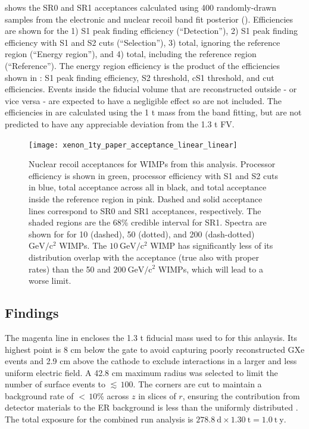  shows the SR0 and SR1 acceptances calculated using 400 randomly-drawn samples from the
electronic and nuclear recoil band fit posterior ().  Efficiencies are shown for the 1) S1 peak finding
efficiency (``Detection''), 2) S1 peak finding efficiency with
S1 and S2 cuts (``Selection''), 3) total, ignoring the reference region (``Energy region''), and 4) total, including the reference
region (``Reference'').  The energy region efficiency is the product of the efficiencies shown
in : S1 peak finding efficiency, S2 threshold, cS1 threshold, and
cut efficiencies.  Events inside the fiducial volume that are reconstructed outside - or vice versa - are expected to have a negligible
effect so are not included.  The
efficiencies in  are calculated using the 1 t mass from the band fitting, but are not
predicted to have any appreciable deviation from the 1.3 t FV.

\begin{figure}
\centering
\texttt{[image: xenon\_1ty\_paper\_acceptance\_linear\_linear]}
\caption[Nuclear recoil acceptances for WIMPs from this analysis and spectra for 10, 50, and $200\ \mathrm{GeV/c^2}$ WIMPs.]{Nuclear
recoil acceptances for WIMPs from this analysis.  Processor efficiency is shown in green, processor efficiency with S1
and S2 cuts in blue, total acceptance across all \cstwob in black, and total acceptance inside the reference region in pink.  Dashed and
solid acceptance lines correspond to SR0 and SR1 acceptances,
respectively.  The shaded regions are the 68\% credible interval for SR1.  Spectra are shown for for 10 (dashed), 50 (dotted), and
200 (dash-dotted) $\mathrm{GeV/c^2}$ WIMPs.  The $10\ \mathrm{GeV/c^2}$ WIMP has significantly less of its distribution overlap with the
acceptance (true also with proper rates) than the 50 and $200\ \mathrm{GeV/c^2}$ WIMPs, which will lead to a worse limit.}
\label{fig:dark_matter_results_acceptances}
\end{figure}



\subsection{Findings}
\label{subsec:dark_matter_results_background}
The magenta line in  encloses the 1.3 t fiducial mass used to for this anlaysis.  Its highest
point is 8 cm below the gate to avoid capturing poorly reconstructed GXe events and 2.9 cm above the cathode to
exclude interactions in a larger and less uniform electric field.  A 42.8 cm maximum radius was selected to limit the number of surface
events to ${\lesssim}\, 100$.  The corners are cut to maintain a background rate of ${<}\, 10\%$ across
$z$ in slices of $r$, ensuring the contribution from detector materials to the ER background is less than the uniformly distributed
.  The total exposure for the combined run analysis is $278.8\ \mathrm{d} \times 1.30\ \mathrm{t} = 1.0\ \mathrm{t\ y}$.

